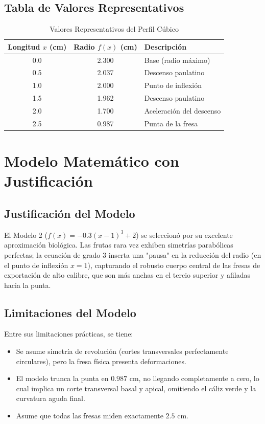\documentclass[conference, Spanish]{IEEEtran}
\begin{document}
\subsection{Tabla de Valores Representativos}
\begin{table}[H]
\centering
\caption{Valores Representativos del Perfil Cúbico}
\begin{tabular}{|c|c|l|}
\hline
\textbf{Longitud $x$ (cm)} & \textbf{Radio $f(x)$ (cm)} & \textbf{Descripción} \\ \hline
0.0 & 2.300 & Base (radio máximo) \\ \hline
0.5 & 2.037 & Descenso paulatino \\ \hline
1.0 & 2.000 & Punto de inflexión \\ \hline
1.5 & 1.962 & Descenso paulatino \\ \hline
2.0 & 1.700 & Aceleración del descenso \\ \hline
2.5 & 0.987 & Punta de la fresa \\ \hline
\end{tabular}
\end{table}

\section{Modelo Matemático con Justificación}
\subsection{Justificación del Modelo}
El Modelo 2 ($f(x) = -0.3(x-1)^3 + 2$) se seleccionó por su excelente aproximación biológica. Las frutas rara vez exhiben simetrías parabólicas perfectas; la ecuación de grado 3 inserta una "pausa" en la reducción del radio (en el punto de inflexión $x=1$), capturando el robusto cuerpo central de las fresas de exportación de alto calibre, que son más anchas en el tercio superior y afiladas hacia la punta.

\subsection{Limitaciones del Modelo}
Entre sus limitaciones prácticas, se tiene:
\begin{itemize}
    \item Se asume simetría de revolución (cortes transversales perfectamente circulares), pero la fresa física presenta deformaciones.
    \item El modelo trunca la punta en $0.987$ cm, no llegando completamente a cero, lo cual implica un corte transversal basal y apical, omitiendo el cáliz verde y la curvatura aguda final.
    \item Asume que todas las fresas miden exactamente $2.5$ cm.
\end{itemize}
\end{document}
